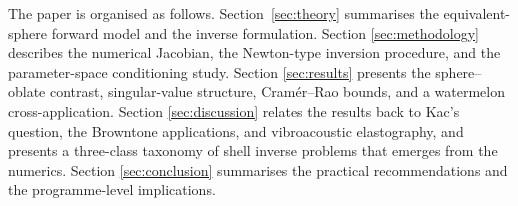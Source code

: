 The paper is organised as follows.  Section~\ref{sec:theory} summarises the
equivalent-sphere forward model and the inverse formulation.  Section
\ref{sec:methodology} describes the numerical Jacobian, the Newton-type
inversion procedure, and the parameter-space conditioning study.  Section
\ref{sec:results} presents the sphere--oblate contrast, singular-value
structure, Cram\'er--Rao bounds, and a watermelon cross-application.  Section
\ref{sec:discussion} relates the results back to Kac's question, the Browntone
applications, and vibroacoustic elastography, and presents a three-class
taxonomy of shell inverse problems that emerges from the numerics.  Section
\ref{sec:conclusion}
summarises the practical recommendations and the programme-level implications.
